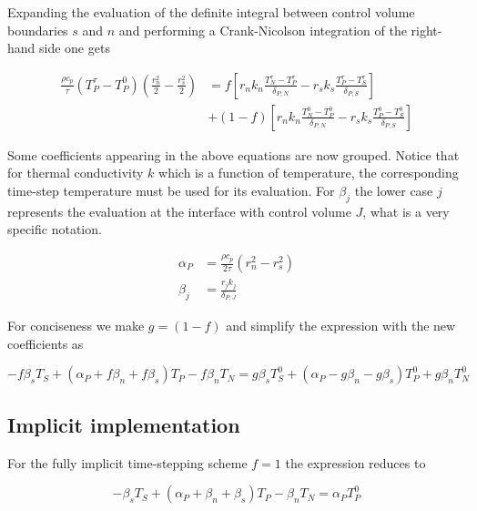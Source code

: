 \documentclass[oneside]{textbook}
\begin{document}
Expanding the evaluation of the definite integral between control volume boundaries $s$ and $n$ and performing a Crank-Nicolson integration of the right-hand side one gets

\begin{equation}
\begin{aligned}
	\frac{\rho{}c_{p}}{\tau}
	\left(T_P^{\tau}-T_P^{0}\right)
	\left(\frac{r_n^2}{2}-\frac{r_s^2}{2}\right)
	&=f\left[
	r_nk_n\frac{T_N^{\tau}-T_P^{\tau}}{\delta_{P,N}}-
	r_sk_s\frac{T_P^{\tau}-T_S^{\tau}}{\delta_{P,S}}
	\right]\\[8pt]
	&+(1-f)\left[
	r_nk_n\frac{T_N^{0}-T_P^{0}}{\delta_{P,N}}-
	r_sk_s\frac{T_P^{0}-T_S^{0}}{\delta_{P,S}}
	\right]
\end{aligned}
\end{equation}

Some coefficients appearing in the above equations are now grouped. Notice that for thermal conductivity $k$ which is a function of temperature, the corresponding time-step temperature must be used for its evaluation. For $\beta_{j}$ the lower case $j$ represents the evaluation at the interface with control volume $J$, what is a very specific notation.

\begin{equation}
\begin{aligned}
	\alpha_{P}  & = \frac{\rho{}c_{p}}{2\tau}\left(r_n^2-r_s^2\right)\\[8pt]
	\beta_{j}   & = \frac{r_jk_j}{\delta_{P,J}}
\end{aligned}
\end{equation}

For conciseness we make $g=(1-f)$ and simplify the expression with the new coefficients as

\begin{equation}
-f\beta_{s}T_S+
(\alpha_{P}+f\beta_{n}+f\beta_{s})T_P
-f\beta_{n}T_N
=
g\beta_{s}T_S^{0}+
(\alpha_{P}-g\beta_{n}-g\beta_{s})T_P^{0}+
g\beta_{n}T_N^{0}
\end{equation}

\subsection{Implicit implementation}

For the fully implicit time-stepping scheme $f=1$ the expression reduces to

\begin{equation}
-\beta_{s}T_S+
(\alpha_{P}+\beta_{n}+\beta_{s})T_P
-\beta_{n}T_N
=
\alpha_{P}T_P^{0}
\end{equation}
\end{document}
